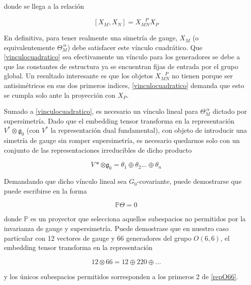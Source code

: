 \documentclass{article}
\numberwithin{equation}{section}
\begin{document}
donde se llega a la relación 

\begin{equation}\label{vinculocuadratico}
\left[X_M, X_N\right] = X_{M N}^{\ \ \ \ P} X_P
\end{equation}

En definitiva, para tener realmente una simetría de gauge, $ X_M $ (o equivalentemente $ \Theta_M^{\ \alpha} $) debe satisfacer este vínculo cuadrático. Que \ref{vinculocuadratico} sea efectivamente un vínculo para los generadores se debe a que las constantes de estructura ya se encuentran fijas de entrada por el grupo global. Un resultado interesante es que los objetos $ X_{M N}^{\ \ \ \ P} $ no tienen porque ser antisimétricos en sus dos primeros indices, \ref{vinculocuadratico} demanda que esto se cumpla solo ante la proyección con $ X_P $.

Sumado a \ref{vinculocuadratico}, es necesario un vínculo lineal para $ \Theta_M^{\ \alpha} $ dictado por supersimetría. Dado que el embedding tensor transforma en la representación $ V^{*} \otimes \mathfrak{g}_0 $  (con $ V^{*} $ la representación dual fundamental), con objeto de introducir una simetría de gauge sin romper supersimetría, es necesario quedarnos solo con un conjunto de las representaciones irreducibles de dicho producto

\begin{equation}
V* \otimes \mathfrak{g}_0 = \theta_1 \oplus \theta_2 \dots \oplus \theta_n
\end{equation}

Demandando que dicho vínculo lineal sea $G_0$-covariante, puede demostrarse que puede escribirse en la forma

\begin{equation}\label{vinculolineal}
\mathbb{P} \Theta = 0
\end{equation} 

donde $ \mathbb{P} $ es un proyector que selecciona aquellos subespacios no permitidos por la invarianza de gauge y supersimetría. Puede demostrase que en nuestro caso particular con 12 vectores de gauge y 66 generadores del grupo $ O(6,6) $, el embedding tensor transforma en la representación

\begin{equation}\label{repO66}
 12 \otimes 66 = 12 \oplus 220 \oplus \dots
\end{equation}

y los únicos subespacios permitidos sorresponden a los primeros 2 de \ref{repO66}.\\
\end{document}
